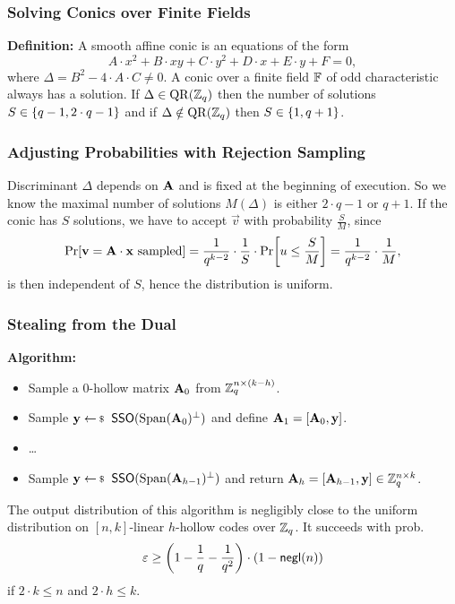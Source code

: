 \documentclass[xcolor=table,10pt,aspectratio=169]{beamer}
\begin{document}
\begin{frame}
  \frametitle{Solving Conics over Finite Fields}
    \textbf{Definition:} A smooth affine conic is an equations of the form
    \[
      A \cdot x^2 + B \cdot xy + C \cdot y^2 + D \cdot x + E \cdot y + F = 0,
    \]
    where \(\Delta = B^2 - 4 \cdot A \cdot C \neq 0\).
  \vfill
   A conic over a finite field \(\mathbb{F}\) of odd characteristic always has a solution. If \(\Delta \in \operatorname{QR}(\mathbb{Z}_q)\) then the number of solutions \(S \in \left\{q-1, 2\cdot q - 1\right\}\) and if \(\Delta \notin \operatorname{QR}(\mathbb{Z}_q)\) then \(S \in \left\{1, q+1\right\}\).
\end{frame}

\begin{frame}
  \frametitle{Adjusting Probabilities with Rejection Sampling}
    Discriminant \(\Delta\) depends on \(\mathbf{A}\) and is fixed at the beginning of execution. So we know the maximal number of solutions \(M(\Delta)\) is either \(2\cdot q - 1\) or \(q+1\).
  \vfill
    If the conic has \(S\) solutions, we have to accept \(\vec{v}\) with probability \(\frac{S}{M}\), since
    \[
      \prob{\vec{v} = \mat{A}\cdot\vec{x} \text{ sampled}}
      = \frac{1}{q^{k-2}} \cdot \frac{1}{S} \cdot \prob{u \leq \frac{S}{M}}
      = \frac{1}{q^{k-2}} \cdot \frac{1}{M},
    \]
    is then independent of \(S\), hence the distribution is uniform.
\end{frame}

\begin{frame}
  \frametitle{Stealing from the Dual}
    \textbf{Algorithm:}
    \begin{itemize}[label=\textbullet]
      \item Sample a \(0\)-hollow matrix \(\mathbf{A}_0\) from \(\mathbb{Z}_q^{n \times (k-h)}\).
      \item Sample \(\vec{y} \sample \SampleSelfOrthogonal(\Span(\mat{A}_0)^\bot)\) and define \(\mathbf{A}_1 = [\mathbf{A}_0, \mathbf{y}]\).
      \item \dots
      \item Sample \(\vec{y} \sample \SampleSelfOrthogonal(\Span(\mat{A}_{h-1})^\bot)\) and return \(\mathbf{A}_h = [\mathbf{A}_{h-1}, \mathbf{y}] \in \mathbb{Z}_q^{n \times k}\).
    \end{itemize}
  \vfill
    The output distribution of this algorithm is negligibly close to the uniform distribution on \([n,k]\)-linear \(h\)-hollow codes over \(\mathbb{Z}_q\). It succeeds with prob.
    \[
      \varepsilon \geq \left( 1 - \frac{1}{q} - \frac{1}{q^2} \right) \cdot \left( 1 - \negl[n] \right)
    \]
    if \(2 \cdot k \leq n\) and \(2 \cdot h \leq k\).
\end{frame}
\end{document}

